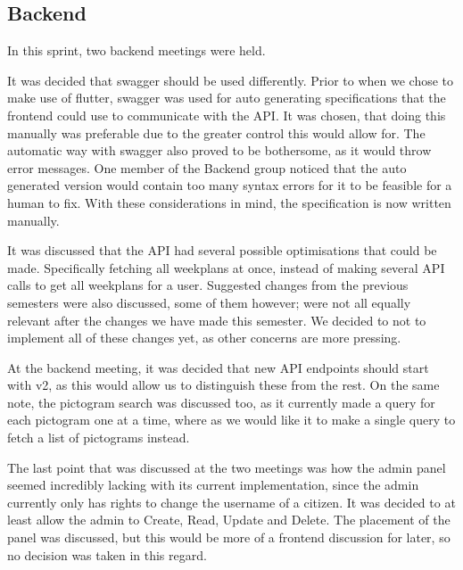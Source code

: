 \subsection{Backend}
In this sprint, two backend meetings were held.

It was decided that swagger should be used differently.
Prior to when we chose to make use of flutter, swagger was used for auto generating specifications that the frontend could use to communicate with the API.
It was chosen, that doing this manually was preferable due to the greater control this would allow for.
The automatic way with swagger also proved to be bothersome, as it would throw error messages.
One member of the Backend group noticed that the auto generated version would contain too many syntax errors for it to be feasible for a human to fix.
With these considerations in mind, the specification is now written manually.

It was discussed that the API had several possible optimisations that could be made.
Specifically fetching all weekplans at once, instead of making several API calls to get all weekplans for a user.
Suggested changes from the previous semesters were also discussed, some of them however; were not all equally relevant after the changes we have made this semester.
We decided to not to implement all of these changes yet, as other concerns are more pressing.

At the backend meeting, it was decided that new API endpoints should start with v2, as this would allow us to distinguish these from the rest.
On the same note, the pictogram search was discussed too, as it currently made a query for each pictogram one at a time, where as we would like it to make a single query to fetch a list of pictograms instead.

The last point that was discussed at the two meetings was how the admin panel seemed incredibly lacking with its current implementation, since the admin currently only has rights to change the username of a citizen. 
It was decided to at least allow the admin to Create, Read, Update and Delete. 
The placement of the panel was discussed, but this would be more of a frontend discussion for later, so no decision was taken in this regard.
